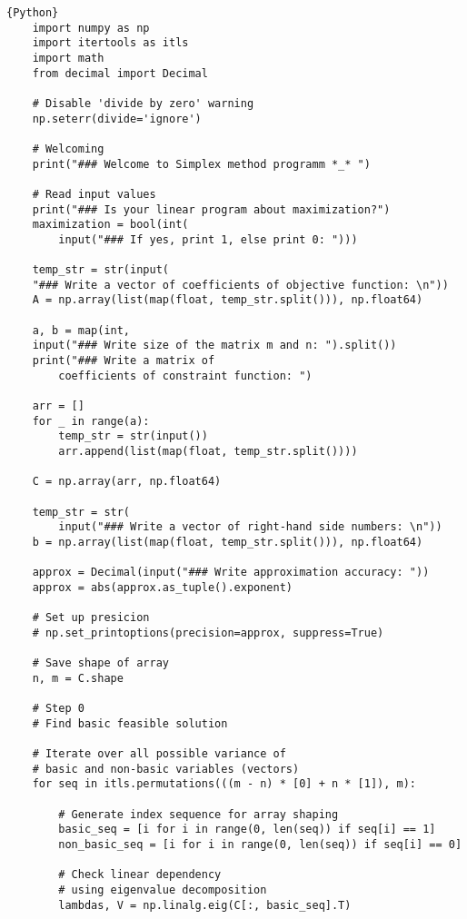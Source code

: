 \documentclass[12pt, legalpaper]{exam}
\begin{document}
\begin{lstlisting}{Python}
    import numpy as np
    import itertools as itls
    import math
    from decimal import Decimal
    
    # Disable 'divide by zero' warning
    np.seterr(divide='ignore')  
    
    # Welcoming
    print("### Welcome to Simplex method programm *_* ")
    
    # Read input values
    print("### Is your linear program about maximization?")
    maximization = bool(int(
        input("### If yes, print 1, else print 0: ")))
    
    temp_str = str(input(
    "### Write a vector of coefficients of objective function: \n"))
    A = np.array(list(map(float, temp_str.split())), np.float64)
    
    a, b = map(int, 
    input("### Write size of the matrix m and n: ").split())
    print("### Write a matrix of 
        coefficients of constraint function: ")
    
    arr = []
    for _ in range(a):
        temp_str = str(input())
        arr.append(list(map(float, temp_str.split())))
    
    C = np.array(arr, np.float64)
    
    temp_str = str(
        input("### Write a vector of right-hand side numbers: \n"))
    b = np.array(list(map(float, temp_str.split())), np.float64)
    
    approx = Decimal(input("### Write approximation accuracy: "))
    approx = abs(approx.as_tuple().exponent)
    
    # Set up presicion
    # np.set_printoptions(precision=approx, suppress=True)
    
    # Save shape of array 
    n, m = C.shape
    
    # Step 0
    # Find basic feasible solution
    
    # Iterate over all possible variance of 
    # basic and non-basic variables (vectors)
    for seq in itls.permutations(((m - n) * [0] + n * [1]), m):
    
        # Generate index sequence for array shaping
        basic_seq = [i for i in range(0, len(seq)) if seq[i] == 1]
        non_basic_seq = [i for i in range(0, len(seq)) if seq[i] == 0]
    
        # Check linear dependency 
        # using eigenvalue decomposition 
        lambdas, V = np.linalg.eig(C[:, basic_seq].T)
        

\end{lstlisting}
\end{document}
